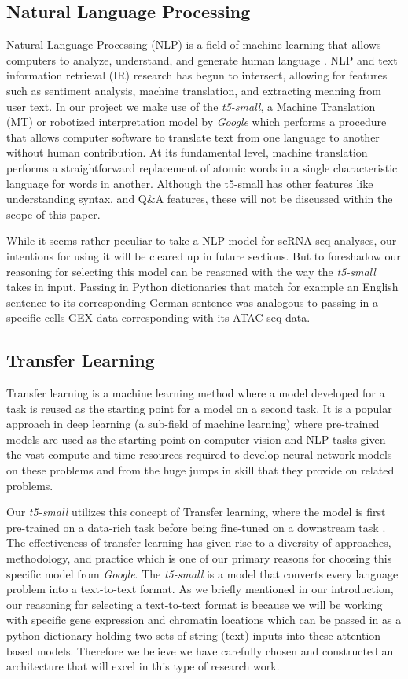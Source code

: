 \subsection{Natural Language Processing}

Natural Language Processing (NLP) is a field of machine learning that allows computers to analyze, understand, and generate human language \cite{three}. 
NLP and text information retrieval (IR) research has begun to intersect, allowing for features such as sentiment analysis, machine translation, and extracting meaning from user text. 
In our project we make use of the \emph{t5-small}, a Machine Translation (MT) or robotized interpretation model by \emph{Google} which performs a procedure that allows computer software to translate text from one language to another without human contribution. 
At its fundamental level, machine translation performs a straightforward replacement of atomic words in a single characteristic language for words in another. 
Although the t5-small has other features like understanding syntax, and Q\&A features, these will not be discussed within the scope of this paper.

While it seems rather peculiar to take a NLP model for scRNA-seq analyses, our intentions for using it will be cleared up in future sections. But to foreshadow our reasoning for selecting this model can be reasoned with the way the \emph{t5-small} takes in input. Passing in Python dictionaries that match for example an English sentence to its corresponding German sentence was analogous to passing in a specific cells GEX data corresponding with its ATAC-seq data. 

\subsection{Transfer Learning}
Transfer learning is a machine learning method where a model developed for a task is reused as the starting point for a model on a second task. 
It is a popular approach in deep learning (a sub-field of machine learning) where pre-trained models are used as the starting point on computer vision and NLP tasks given the vast compute and time resources required to develop neural network models on these problems and from the huge jumps in skill that they provide on related problems. 

Our \emph{t5-small} utilizes this concept of Transfer learning, where the model is first pre-trained on a data-rich task before being fine-tuned on a downstream task \cite{four}. 
The effectiveness of transfer learning has given rise to a diversity of approaches, methodology, and practice which is one of our primary reasons for choosing this specific model from \emph{Google}. 
The \emph{t5-small} is a model that converts every language problem into a text-to-text format. 
As we briefly mentioned in our introduction, our reasoning for selecting a text-to-text format is because we will be working with specific gene expression and chromatin locations which can be passed in as a python dictionary holding two sets of string (text) inputs into these attention-based models. 
Therefore we believe we have carefully chosen and constructed an architecture that will excel in this type of research work. 

